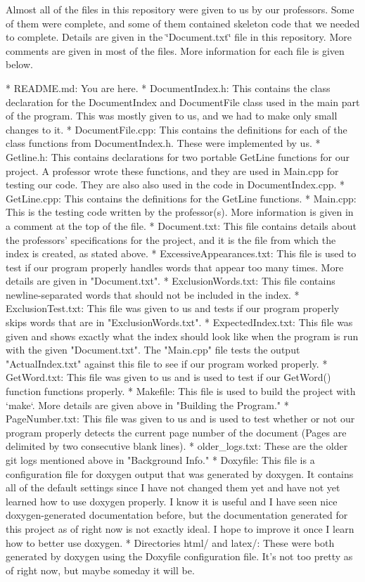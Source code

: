 Almost all of the files in this repository were given to us by our professors. Some of them were complete, and some of them contained skeleton code that we needed to complete. Details are given in the \char`\"{}\+Document.\+txt\char`\"{} file in this repository. More comments are given in most of the files. More information for each file is given below. \begin{DoxyVerb}* README.md: You are here.
* DocumentIndex.h: This contains the class declaration for the DocumentIndex and DocumentFile class used in the main part of the program. This was mostly given to us, and we had to make only small changes to it.
* DocumentFile.cpp: This contains the definitions for each of the class functions from DocumentIndex.h. These were implemented by us.
* Getline.h: This contains declarations for two portable GetLine functions for our project. A professor wrote these functions, and they are used in Main.cpp for testing our code. They are also also used in the code in DocumentIndex.cpp.
* GetLine.cpp: This contains the definitions for the GetLine functions.
* Main.cpp: This is the testing code written by the professor(s). More information is given in a comment at the top of the file.
* Document.txt: This file contains details about the professors' specifications for the project, and it is the file from which the index is created, as stated above.
* ExcessiveAppearances.txt: This file is used to test if our program properly handles words that appear too many times. More details are given in "Document.txt".
* ExclusionWords.txt: This file contains newline-separated words that should not be included in the index.
* ExclusionTest.txt: This file was given to us and tests if our program properly skips words that are in "ExclusionWords.txt".
* ExpectedIndex.txt: This file was given and shows exactly what the index should look like when the program is run with the given "Document.txt". The "Main.cpp" file tests the output "ActualIndex.txt" against this file to see if our program worked properly.
* GetWord.txt: This file was given to us and is used to test if our GetWord() function functions properly.
* Makefile: This file is used to build the project with `make`. More details are given above in "Building the Program."
* PageNumber.txt: This file was given to us and is used to test whether or not our program properly detects the current page number of the document (Pages are delimited by two consecutive blank lines).
* older_logs.txt: These are the older git logs mentioned above in "Background Info."
* Doxyfile: This file is a configuration file for doxygen output that was generated by doxygen. It contains all of the default settings since I have not changed them yet and have not yet learned how to use doxygen properly. I know it is useful and I have seen nice doxygen-generated documentation before, but the documentation generated for this project as of right now is not exactly ideal. I hope to improve it once I learn how to better use doxygen.
* Directories html/ and latex/: These were both generated by doxygen using the Doxyfile configuration file. It's not too pretty as of right now, but maybe someday it will be.\end{DoxyVerb}
 